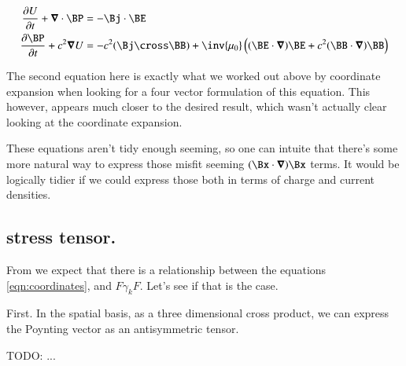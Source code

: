\documentclass{article}
\begin{document}
\begin{align}\label{eqn:withPoyntingAndEnergy}
\PD{t}{U} + \spacegrad \cdot \BP &= -\Bj \cdot \BE \\
\PD{t}{\BP} + c^2 \spacegrad U &= -c^2 (\Bj \cross \BB) + \inv{\mu_0} \left( (\BE \cdot \spacegrad) \BE + c^2 (\BB \cdot \spacegrad) \BB \right) 
\end{align}

The second equation here is exactly what we worked out above by coordinate expansion when looking for a four vector formulation
of this equation.  This however, appears much closer to the desired result, which wasn't actually clear looking at the
coordinate expansion.

These equations aren't tidy enough seeming, so one can intuite that there's some more natural way to express those
misfit seeming $(\Bx \cdot \spacegrad) \Bx$ terms.
It would be logically tidier if we could express those both in terms of charge and current densities.

\subsection{ stress tensor. }

From \cite{doran2003gap} we expect that there is a relationship between
the equations \ref{eqn:coordinates}, and $F \gamma_k F$.  Let's see if that
is the case.

First.  In the spatial basis, as a three dimensional cross product, we can express the Poynting vector as an antisymmetric tensor.


TODO: ...

%
%
%
%
%



\end{document}
